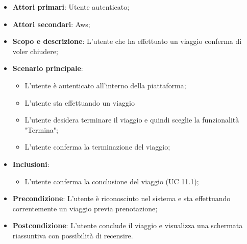         \begin{itemize}
        \item \textbf{Attori primari}: Utente autenticato;
        \item \textbf{Attori secondari}: Aws;
        \item \textbf{Scopo e descrizione}: L'utente che ha effettuato un viaggio conferma di voler chiudere; 
        \item \textbf{Scenario principale}:
            \begin{itemize}
                \item L'utente è autenticato all'interno della piattaforma;
                \item L'utente sta effettuando un viaggio
                \item L'utente desidera terminare il viaggio e quindi sceglie la funzionalità "Termina";
                \item L'utente conferma la terminazione del viaggio;
            \end{itemize}
         
        \item \textbf{Inclusioni}:
             \begin{itemize}
                \item L'utente conferma la conclusione del viaggio (UC 11.1);
            \end{itemize}
        \item \textbf{Precondizione}: L'utente è riconosciuto nel sistema e sta effettuando correntemente un viaggio previa prenotazione;
        \item \textbf{Postcondizione}: L'utente conclude il viaggio e visualizza una schermata riassuntiva con possibilità di recensire.
        \end{itemize}



